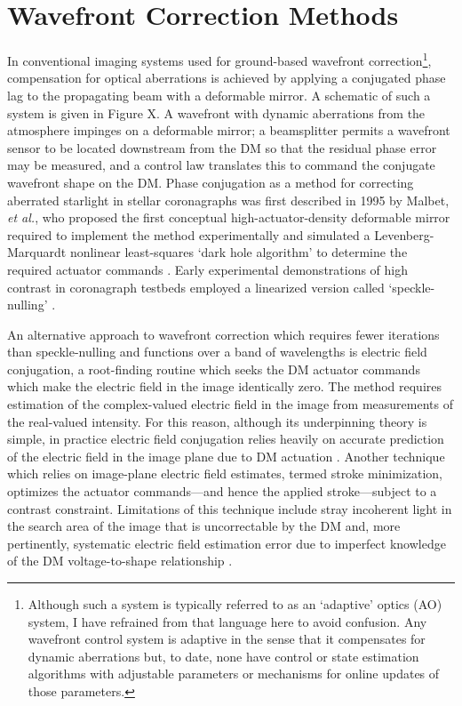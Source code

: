 \documentclass[11pt,reqno]{amsart}
\begin{document}
\section{Wavefront Correction Methods}\label{sec:wavecontrol}

In conventional imaging systems used for ground-based wavefront correction\footnote{Although such a system is typically referred to as an `adaptive' optics (AO) system, I have refrained from that language here to avoid confusion.  Any wavefront control system is adaptive in the sense that it compensates for dynamic aberrations but, to date, none have control or state estimation algorithms with adjustable parameters or mechanisms for online updates of those parameters.}, compensation for optical aberrations is achieved by applying a conjugated phase lag to the propagating beam with a deformable mirror.  A schematic of such a system is given in Figure X.  A wavefront with dynamic aberrations from the atmosphere impinges on a deformable mirror; a beamsplitter permits a wavefront sensor to be located downstream from the DM so that the residual phase error may be measured, and a control law translates this to command the conjugate wavefront shape on the DM.  Phase conjugation as a method for correcting aberrated starlight in stellar coronagraphs was first described in 1995 by Malbet, \textit{et al.}, who proposed the first conceptual high-actuator-density deformable mirror required to implement the method experimentally and simulated a Levenberg-Marquardt nonlinear least-squares `dark hole algorithm' to determine the required actuator commands \cite{Malbet1995}.  Early experimental demonstrations of high contrast in coronagraph testbeds employed a linearized version called `speckle-nulling' \cite{Trauger2004, Giveon2006}.

An alternative approach to wavefront correction which requires fewer iterations than speckle-nulling and functions over a band of wavelengths is electric field conjugation, a root-finding routine which seeks the DM actuator commands which make the electric field in the image identically zero.  The method requires estimation of the complex-valued electric field in the image from measurements of the real-valued intensity.  For this reason, although its underpinning theory is simple, in practice electric field conjugation relies heavily on accurate prediction of the electric field in the image plane due to DM actuation \cite{Giveon2007, Giveon2007a}.  Another technique which relies on image-plane electric field estimates, termed stroke minimization, optimizes the actuator commands---and hence the applied stroke---subject to a contrast constraint.  Limitations of this technique include stray incoherent light in the search area of the image that is uncorrectable by the DM and, more pertinently, systematic electric field estimation error due to imperfect knowledge of the DM voltage-to-shape relationship \cite{Pueyo2009}.
\end{document}
